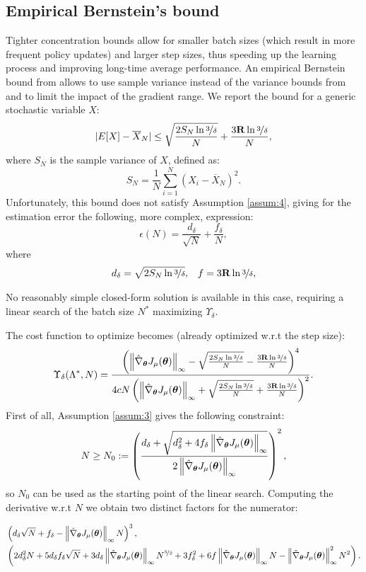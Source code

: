 \subsection{Empirical Bernstein's bound}
Tighter concentration bounds allow for smaller batch sizes (which result in more frequent policy updates) and larger step sizes, thus speeding up the learning process and improving long-time average performance. An empirical Bernstein bound from \cite{Mnih:2008:EBS:1390156.1390241} allows to use sample variance instead of the variance bounds from \cite{DBLP:journals/nn/ZhaoHNS12} and to limit the impact of the gradient range. We report the bound for a generic stochastic variable $X$:
\[
	|E[X] - \overline{X}_N| \leq  \sqrt{\frac{2S_N\ln{\nicefrac{3}{\delta}}}{N}}
		+ \frac{3\mathbf{R}\ln{\nicefrac{3}{\delta}}}{N},
\]
where $S_N$ is the sample variance of $X$, defined as:
\[
	S_N = \frac{1}{N}\sum\limits_{i=1}^N(X_i - \overline{X}_N)^2.
\]
Unfortunately, this bound does not satisfy Assumption \ref{assum:4}, giving for the estimation error the following, more complex, expression:
 \[
 \epsilon(N) = \frac{d_\delta}{\sqrt{N}} + \frac{f_\delta}{N},
\]
where
\begin{align*}
d_\delta= \sqrt{2S_N\ln{\nicefrac{3}{\delta}}}, && f=3\mathbf{R}\ln{\nicefrac{3}{\delta}},
\end{align*}

No reasonably simple closed-form solution is available in this case, requiring a linear search of the batch size $N^*$ maximizing $\Upsilon_\delta$. 

The cost function to optimize becomes (already optimized w.r.t the step size):
\[
\Upsilon_{\delta}(\Lambda^*,N) = \frac{\left(\norm[\infty]{\gradApp{\vtheta}} - 
		\sqrt{\frac{2S_N\ln{\nicefrac{3}{\delta}}}{N}} - \frac{3\mathbf{R}\ln{\nicefrac{3}{\delta}}}{N}\right)^4}
		{4cN
		\left(\norm[\infty]{\gradApp{\vtheta}} + 
				\sqrt{\frac{2S_N\ln{\nicefrac{3}{\delta}}}{N}} + \frac{3\mathbf{R}\ln{\nicefrac{3}{\delta}}}{N}\right)^2}.
\]
First of all, Assumption \ref{assum:3} gives the following constraint:
\[
N \geq N_0 := \left(\frac{d_{\delta} + \sqrt{d_{\delta}^2 + 4f_{\delta}\norm[\infty]{\gradApp{\vtheta}}}}
{2\norm[\infty]{\gradApp{\vtheta}}}
\right)^2,
\]
so $N_0$ can be used as the starting point of the linear search.
Computing the derivative w.r.t $N$ we obtain two distinct factors for the numerator:

\begin{scriptsize}
\begin{align*}
&\left(d_{\delta}\sqrt{N}+f_{\delta} - \norm[\infty]{\gradApp{\vtheta}}N\right)^3, \\
&\left(2d_{\delta}^2N+5d_{\delta}f_{\delta}\sqrt{N}+3d_{\delta}\norm[\infty]{\gradApp{\vtheta}}N^{\nicefrac{3}{2}} +3f_{\delta}^2+6f\norm[\infty]{\gradApp{\vtheta}}N-\norm[\infty]{\gradApp{\vtheta}}^2N^2\right).
\end{align*}
\end{scriptsize}

